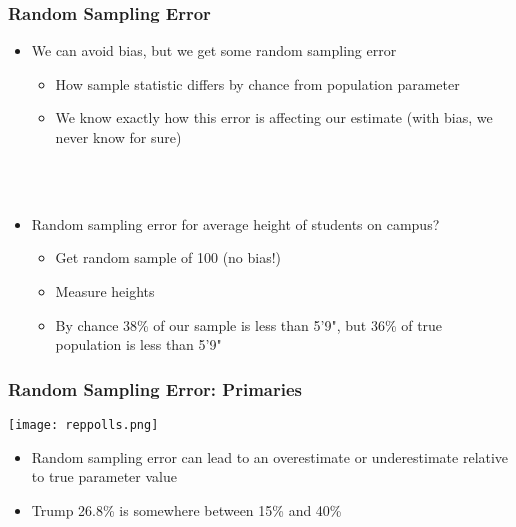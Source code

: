 \documentclass{beamer}
\begin{document}
\begin{frame}
 \frametitle<+->{Random Sampling Error}
 \begin{minipage}{.35\linewidth}
 \begin{itemize}[<+->]
   \item We can avoid bias, but we get some \alert{random sampling error}
     \begin{itemize}
       \item How sample statistic \alert{differs by chance} from population parameter
       \item We know exactly how this error is affecting our estimate (with bias, we never know for sure)
     \end{itemize}
 \end{itemize}
 \end{minipage}\hfill
 \begin{minipage}{.65\linewidth}
 \\
 \\
   \begin{itemize}[<+->]     
      \item Random sampling error for average height of students on campus?
        \begin{itemize}
          \item Get random sample of 100 (no bias!)
          \item Measure heights
          \item By chance 38\% of our sample is less than 5'9", but 36\% of true population is less than 5'9"
        \end{itemize}
   \end{itemize}
 \end{minipage}
\end{frame}

\begin{frame}
 \frametitle<+->{Random Sampling Error: Primaries}
 \begin{minipage}{.58\linewidth}
 \texttt{[image: reppolls.png]}
 \end{minipage}\hfill
 \begin{minipage}{.38\linewidth}
 \begin{itemize}[<+->]
   \item Random sampling error can lead to an overestimate or underestimate relative to true parameter value
   \item Trump 26.8\% is somewhere between 15\% and 40\%
 \end{itemize}
 \end{minipage}
\end{frame}
\end{document}
